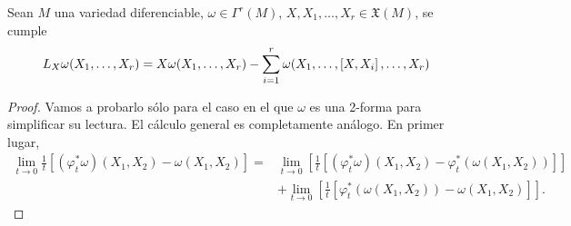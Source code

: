 \begin{prop}
  Sean $M$ una variedad diferenciable, $\omega \in \Gamma^r(M)$, $X,X_1,\dots,X_r\in \mathfrak{X} (M)$, se cumple
  \begin{equation*}
    L_{X}\omega(X_1,\dots,X_r)=X\omega(X_1,\dots,X_r)-\sum_{i=1}^r \omega(X_1,\dots,\left[X,X_i\right],\dots,X_r)
  \end{equation*}
\end{prop}
\begin{proof}
  Vamos a probarlo sólo para el caso en el que $\omega$ es una 2-forma para simplificar su lectura. El cálculo general es completamente análogo.
  En primer lugar,
  \begin{align*}
    \lim_{t\rightarrow 0}\frac{1}{t}[(\varphi_t^* \omega)(X_1,X_2) - \omega (X_1,X_2)] =&\lim_{t\rightarrow 0}\left[\frac{1}{t}[(\varphi_t^* \omega)(X_1,X_2) - \varphi_t^*(\omega(X_1,X_2))]\right] \\
    &+ \lim_{t\rightarrow 0}\left[\frac{1}{t}[\varphi_t^*(\omega(X_1,X_2))-\omega(X_1,X_2)]\right].
  \end{align*}


\end{proof}
